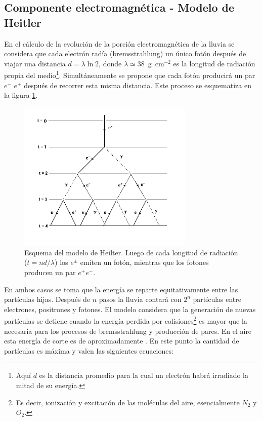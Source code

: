 \subsection{Componente electromagnética - Modelo de Heitler}
En el cálculo de la evolución de la porción electromagnética de la lluvia se considera que cada electrón radía (bremsstrahlung) un único fotón después de viajar una distancia $d=\lambda \ln 2$, donde $\lambda\simeq38$~g~cm$^{-2}$ es la longitud de radiación propia del medio\footnote{Aqu\'i $d$ es la distancia promedio para la cual un electrón habrá irradiado la mitad de su energía.}. Simultáneamente se propone que cada fotón producirá un par $e^{-}$ $e^{+}$ después de recorrer esta misma distancia.
Este proceso se esquematiza en la figura \ref{fig:heilter}.
%
\begin{figure}[ht]
\begin{center}
\includegraphics[width=0.75\textwidth]{fig/EASAuger/heilterSchema}
\caption{Esquema del modelo de Heilter. Luego de cada longitud de radiación ($t=nd/\lambda$) los $e^\pm$ emiten un fotón, mientras que los fotones producen un par $e^+e^-$.}
\label{fig:heilter}
\end{center}
\end{figure}
%
En ambos casos se toma que la energía se reparte equitativamente entre las partículas hijas. Después de $n$ pasos la lluvia contará con $2^{n}$ partículas entre electrones, positrones y fotones. El modelo considera que la generación de nuevas partículas se detiene cuando la energía perdida por colisiones\footnote{Es decir, ionizaci\'on y excitaci\'on de las mol\'eculas del aire, esencialmente $N_2$ y $O_2$.} es mayor que la necesaria para los procesos de bremsstrahlung y producción de pares. En el aire esta energía de corte es de aproximadamente . En este punto la cantidad de partículas es máxima y valen las siguientes ecuaciones:
